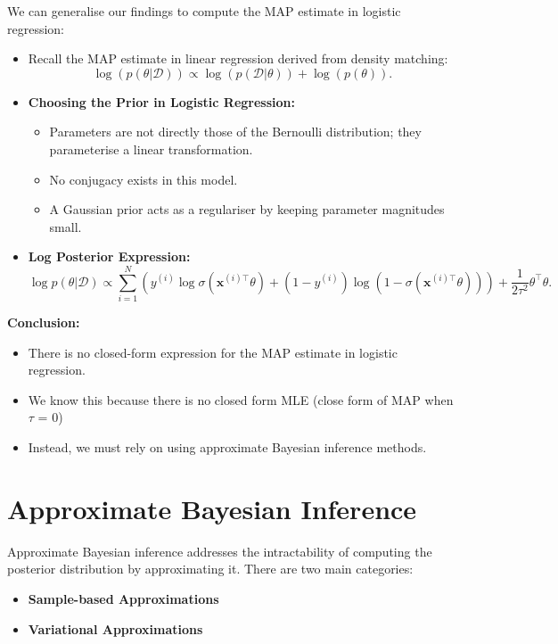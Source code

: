 We can generalise our findings to compute the MAP estimate in logistic regression:
\begin{itemize}
    \item Recall the MAP estimate in linear regression derived from density matching:
          \[
              \log(p(\theta|\mathcal{D})) \propto \log(p(\mathcal{D}|\theta)) + \log(p(\theta)).
          \]
    \item \textbf{Choosing the Prior in Logistic Regression:}
          \begin{itemize}
              \item Parameters are not directly those of the Bernoulli distribution; they parameterise a linear transformation.
              \item No conjugacy exists in this model.
              \item A Gaussian prior acts as a regulariser by keeping parameter magnitudes small.
          \end{itemize}
    \item \textbf{Log Posterior Expression:}
          \[
              \log p(\theta|\mathcal{D}) \propto \sum_{i=1}^N \left( y^{(i)} \log \sigma(\mathbf{x}^{(i)\top}\theta) + (1 - y^{(i)}) \log \left(1 - \sigma(\mathbf{x}^{(i)\top}\theta)\right) \right) + \frac{1}{2\tau^2} \theta^\top \theta.
          \]
\end{itemize}

\textbf{Conclusion:}
\begin{itemize}
    \item There is no closed-form expression for the MAP estimate in logistic regression.
    \item We know this because there is no closed form MLE (close form of MAP when $\tau$ = 0)
    \item Instead, we must rely on using approximate Bayesian inference methods.
\end{itemize}


\section{Approximate Bayesian Inference}

Approximate Bayesian inference addresses the intractability of computing the posterior distribution by approximating it. There are two main categories:

\begin{itemize}
    \item \textbf{Sample-based Approximations}
    \item \textbf{Variational Approximations}
\end{itemize}

